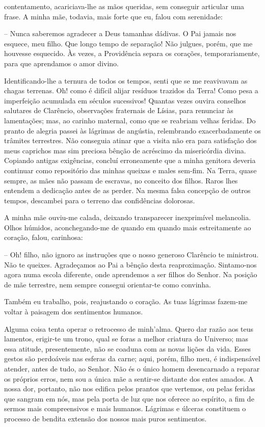 \documentclass[portuguese,12pt,a4paper]{scrbook}
\begin{document}
	
	contentamento, acariciava-lhe as mãos queridas, sem conseguir articular uma frase. A minha mãe, todavia, mais forte que eu, falou com serenidade:
	
	– Nunca saberemos agradecer a Deus tamanhas dádivas. O Pai jamais nos esquece, meu filho. Que longo tempo de separação! Não julgues, porém, que me houvesse esquecido. Às vezes, a Providência separa os corações, temporariamente, para que aprendamos o amor divino.
	
	Identificando-lhe a ternura de todos os tempos, senti que se me reavivavam as chagas terrenas. Oh! como é difícil alijar resíduos trazidos da Terra! Como pesa a imperfeição acumulada em séculos sucessivos! Quantas vezes ouvira conselhos salutares de Clarêncio, observações fraternais de Lísias, para renunciar às lamentações; mas, ao carinho maternal, como que se reabriam velhas feridas. Do pranto de alegria passei às lágrimas de angústia, relembrando exacerbadamente os trâmites terrestres. Não conseguia atinar que a visita não era para satisfação dos meus caprichos mas sim preciosa bênção de acréscimo da misericórdia divina. Copiando antigas exigências, concluí erroneamente que a minha genitora deveria continuar como repositório das minhas queixas e males sem-fim. Na Terra, quase sempre, as mães não passam de escravas, no conceito dos filhos. Raros lhes entendem a dedicação antes de as perder. Na mesma falsa concepção de outros tempos, descambei para o terreno das confidências dolorosas.
	
	A minha mãe ouviu-me calada, deixando transparecer inexprimível melancolia. Olhos húmidos, aconchegando-me de quando em quando mais estreitamente ao coração, falou, carinhosa:
	
	– Oh! filho, não ignoro as instruções que o nosso generoso Clarêncio te ministrou. Não te queixes. Agradeçamos ao Pai a bênção desta reaproximação. Sintamo-nos agora numa escola diferente, onde aprendemos a ser filhos do Senhor. Na posição de mãe terrestre, nem sempre consegui orientar-te como convinha.
	
	
	Também eu trabalho, pois, reajustando o coração. As tuas lágrimas fazem-me voltar à paisagem dos sentimentos humanos.
	
	Alguma coisa tenta operar o retrocesso de minh'alma. Quero dar razão aos teus lamentos, erigir-te um trono, qual se foras a melhor criatura do Universo; mas essa atitude, presentemente, não se coaduna com as novas lições da vida. Esses gestos são perdoáveis nas esferas da carne; aqui, porém, filho meu, é indispensável atender, antes de tudo, ao Senhor. Não és o único homem desencarnado a reparar os próprios erros, nem sou a única mãe a sentir-se distante dos entes amados. A nossa dor, portanto, não nos edifica pelos prantos que vertemos, ou pelas feridas que sangram em nós, mas pela porta de luz que nos oferece ao espírito, a fim de sermos mais compreensivos e mais humanos. Lágrimas e úlceras constituem o processo de bendita extensão dos nossos mais puros sentimentos.
	
\end{document}
